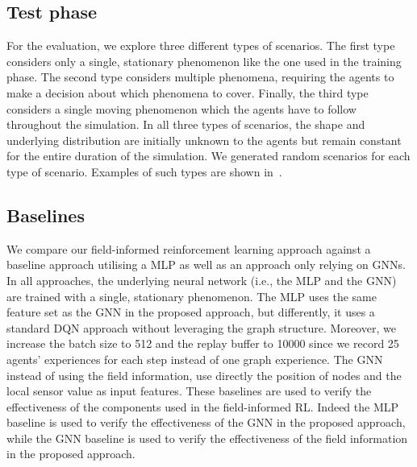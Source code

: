 \documentclass[conference]{IEEEtran}
\begin{document}
\subsection{Test phase}
For the evaluation, 
 we explore three different types of scenarios.
%
The first type considers only a single, stationary phenomenon like the one used in the training phase. 
%
The second type considers multiple phenomena, requiring the agents to make a decision about which phenomena to cover. 
%
Finally, the third type considers a single moving phenomenon which the agents have to follow throughout the simulation. 
%
In all three types of scenarios, the shape and underlying distribution are initially unknown to the agents but remain constant for the entire duration of the simulation. 
%
We generated random scenarios for each type of scenario. 
%
Examples of such types are shown in~. %


\subsection{Baselines}
We compare our field-informed reinforcement learning approach against a baseline approach utilising a \ac{MLP} as well as an approach only relying on \acp{GNN}. 
%
In all approaches, the underlying neural network (i.e., the \ac{MLP} and the \ac{GNN}) are trained %
with a single, stationary phenomenon.
%
The \ac{MLP} uses the same feature set as the \ac{GNN} in the proposed approach, but differently, it uses a standard DQN approach without leveraging the graph structure. Moreover, we increase the batch size to 512 and the replay buffer to 10000 since we record 25 agents' experiences for each step instead of one graph experience.
%
The \ac{GNN} instead of using the field information, use directly the position of nodes and the local sensor value as input features.
%
These baselines are used to verify the effectiveness of the components used in the field-informed \ac{RL}. 
%
Indeed the \ac{MLP} baseline is used to verify the effectiveness of the \ac{GNN} in the proposed approach, while the \ac{GNN} baseline is used to verify the effectiveness of the field information in the proposed approach.
\end{document}
